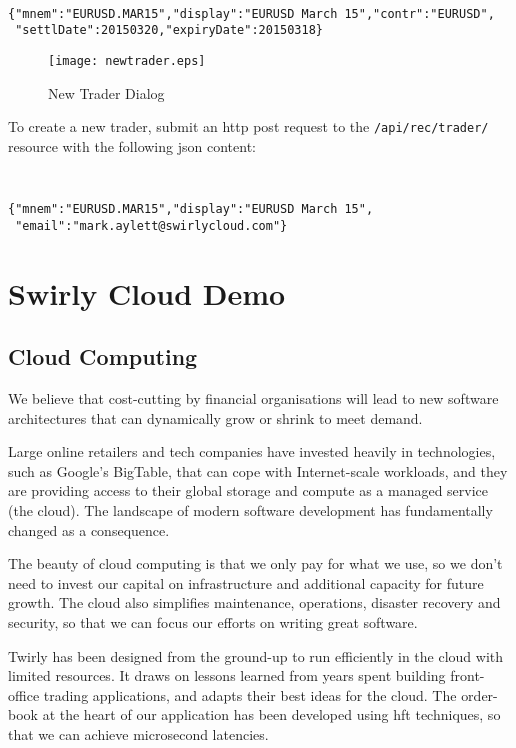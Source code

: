\documentclass[11pt,a4paper]{article}
\newcommand{\twirly}{Twirly\cite{twirly}}
\begin{document}
{\tt\small
\begin{verbatim}
{"mnem":"EURUSD.MAR15","display":"EURUSD March 15","contr":"EURUSD",
 "settlDate":20150320,"expiryDate":20150318}
\end{verbatim}
}

\begin{figure}[H]
\centering
\texttt{[image: newtrader.eps]}
\caption{New Trader Dialog}
\end{figure}

To create a new trader, submit an \gls{http} post request to the \texttt{/api/rec/trader/} resource
with the following \gls{json} content:

{\tt\small
\begin{verbatim}
{"mnem":"EURUSD.MAR15","display":"EURUSD March 15",
 "email":"mark.aylett@swirlycloud.com"}
\end{verbatim}
}

\section{Swirly Cloud Demo}

\subsection{Cloud Computing}

We believe that cost-cutting by financial organisations will lead to new software architectures that
can dynamically grow or shrink to meet demand.

Large online retailers and tech companies have invested heavily in technologies, such as
Google's\cite{google} BigTable\cite{bigtable}, that can cope with Internet-scale workloads, and they
are providing access to their global storage and compute as a managed service (the \gls{cloud}). The
landscape of modern software development has fundamentally changed as a consequence.

The beauty of \gls{cloud} computing is that we only pay for what we use, so we don't need to invest
our capital on infrastructure and additional capacity for future growth. The \gls{cloud} also
simplifies maintenance, operations, disaster recovery and security, so that we can focus our efforts
on writing great software.

\twirly{} has been designed from the ground-up to run efficiently in the \gls{cloud} with limited
resources.  It draws on lessons learned from years spent building front-office trading applications,
and adapts their best ideas for the \gls{cloud}. The \gls{order-book} at the heart of our
application has been developed using \gls{hft} techniques, so that we can achieve microsecond
latencies.
\end{document}
